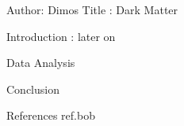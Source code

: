 Author: Dimos
Title :  Dark Matter

Introduction :  later on 

Data
Analysis 

Conclusion 


References 
ref.bob
